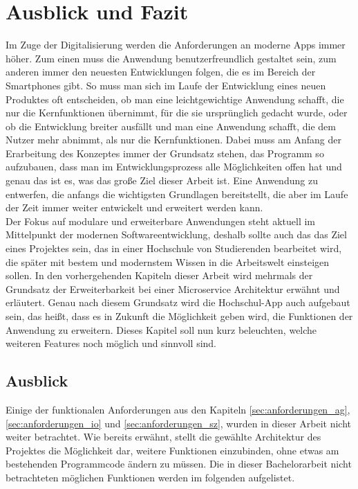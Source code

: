 \chapter{Ausblick und Fazit}
\label{sec:ausblick_fazit}

Im Zuge der Digitalisierung werden die Anforderungen an moderne \acp{App} immer höher. Zum einen muss die Anwendung benutzerfreundlich gestaltet sein, zum anderen immer den neuesten Entwicklungen folgen, die es im Bereich der Smartphones gibt. So muss man sich im Laufe der Entwicklung eines neuen Produktes oft entscheiden, ob man eine leichtgewichtige Anwendung schafft, die nur die Kernfunktionen übernimmt, für die sie ursprünglich gedacht wurde, oder ob die Entwicklung breiter ausfällt und man eine Anwendung schafft, die dem Nutzer mehr abnimmt, als nur die Kernfunktionen. Dabei muss am Anfang der Erarbeitung des Konzeptes immer der Grundsatz stehen, das Programm so aufzubauen, dass man im Entwicklungsprozess alle Möglichkeiten offen hat und genau das ist es, was das große Ziel dieser Arbeit ist. Eine Anwendung zu entwerfen, die anfangs die wichtigsten Grundlagen bereitstellt, die aber im Laufe der Zeit immer weiter entwickelt und erweitert werden kann.
\\
\linebreak
Der Fokus auf modulare und erweiterbare Anwendungen steht aktuell im Mittelpunkt der modernen Softwareentwicklung, deshalb sollte auch das das Ziel eines Projektes sein, das in einer Hochschule von Studierenden bearbeitet wird, die später mit bestem und modernstem Wissen in die Arbeitswelt einsteigen sollen. In den vorhergehenden Kapiteln dieser Arbeit wird mehrmals der Grundsatz der Erweiterbarkeit bei einer Microservice Architektur erwähnt und erläutert. Genau nach diesem Grundsatz wird die Hochschul-\ac{App} auch aufgebaut sein, das heißt, dass es in Zukunft die Möglichkeit geben wird, die Funktionen der Anwendung zu erweitern. Dieses Kapitel soll nun kurz beleuchten, welche weiteren Features noch möglich und sinnvoll sind.

\section{Ausblick\label{sec:ausblick}}

Einige der funktionalen Anforderungen aus den Kapiteln \ref{sec:anforderungen_ag}, \ref{sec:anforderungen_io} und \ref{sec:anforderungen_sz}, wurden in dieser Arbeit nicht weiter betrachtet. Wie bereits erwähnt, stellt die gewählte Architektur des Projektes die Möglichkeit dar, weitere Funktionen einzubinden, ohne etwas am bestehenden Programmcode ändern zu müssen. Die in dieser Bachelorarbeit nicht betrachteten möglichen Funktionen werden im folgenden aufgelistet.

